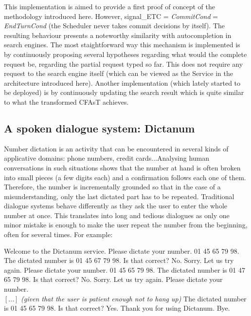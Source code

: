         This implementation is aimed to provide a first proof of concept of the methodology introduced here. However, signal\_ETC = \textit{CommitCond} = \textit{EndTurnCond} (the Scheduler never takes commit decisions by itself). The resulting behaviour presents a noteworthy similarity with autocompletion in search engines. The most staightforward way this mechanism is implemented is by continuously proposing several hypotheses regarding what would the complete request be, regarding the partial request typed so far. This does not require any request to the search engine itself (which can be viewed as the Service in the architecture introduced here). Another implementation (which lately started to be deployed) is by continuously updating the search result which is quite similar to what the transformed CFAsT achieves.
    
    \subsection{A spoken dialogue system: Dictanum}
    
    	Number dictation is an activity that can be encountered in several kinds of applicative domains: phone numbers, credit cards...Analysing human conversations in such situations shows that the number at hand is often broken into small pieces (a few digits each) and a confirmation follows each one of them. Therefore, the number is incrementally grounded so that in the case of a misunderstanding, only the last dictated part has to be repeated. Traditional dialogue systems behave differently as they ask the user to enter the whole number at once. This translates into long and tedious dialogues as only one minor mistake is enough to make the user repeat the number from the beginning, often for several times. For example:
        
        \begin{dialogue}
        	 Welcome to the Dictanum service. Please dictate your number.
             01 45 65 79 98.
             The dictated number is 01 45 67 79 98. Is that correct?
             No.
             Sorry. Let us try again. Please dictate your number.
             01 45 65 79 98.
             The dictated number is 01 47 65 79 98. Is that correct?
             No.
             Sorry. Let us try again. Please dictate your number. \\
            $\left[...\right]$ \textit{(given that the user is patient enough not to hang up)}
             The dictated number is 01 45 65 79 98. Is that correct?
             Yes.
             Thank you for using Dictanum. Bye.
        \end{dialogue}
        
